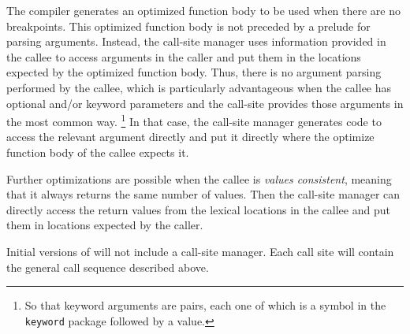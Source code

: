 The compiler generates an optimized function body to be used when
there are no breakpoints.  This optimized function body is not
preceded by a prelude for parsing arguments.  Instead, the call-site
manager uses information provided in the callee to access arguments in
the caller and put them in the locations expected by the optimized
function body.  Thus, there is no argument parsing performed by the
callee, which is particularly advantageous when the callee has
optional and/or keyword parameters and the call-site provides those
arguments in the most common way.%
\footnote{So that keyword arguments are pairs, each one of which is a
  symbol in the \texttt{keyword} package followed by a value.}
In that case, the call-site manager generates code to access the
relevant argument directly and put it directly where the optimize
function body of the callee expects it.

Further optimizations are possible when the callee is \emph{values
  consistent}, meaning that it always returns the same number of
values.  Then the call-site manager can directly access the return
values from the lexical locations in the callee and put them in
locations expected by the caller.

Initial versions of \sysname{} will not include a call-site manager.
Each call site will contain the general call sequence described
above.

